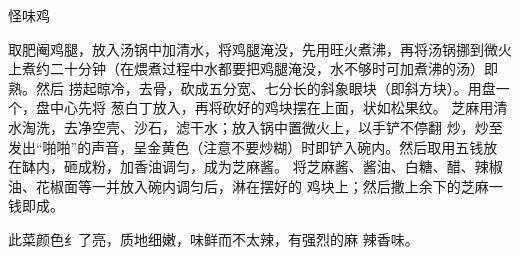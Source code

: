 \begin{recipe}{怪味鸡}

\ingredients


\cooking

\step 取肥阉鸡腿，放入汤锅中加清水，将鸡腿淹没，先用旺火煮沸，再将汤锅挪到微火
上煮约二十分钟（在煨煮过程中水都要把鸡腿淹没，水不够时可加煮沸的汤）即熟。然后
捞起晾冷，去骨，砍成五分宽、七分长的斜象眼块（即斜方块）。用盘一个，盘中心先将
葱白丁放入，再将砍好的鸡块摆在上面，状如松果纹。
\step 芝麻用清水淘洗，去净空壳、沙石，滤干水；放入锅中置微火上，以手铲不停翻
炒，炒至发出“啪啪”的声音，呈金黄色（注意不要炒糊）时即铲入碗内。然后取用五钱放
在缽内，砸成粉，加香油调匀，成为芝麻酱。
\step 将芝麻酱、酱油、白糖、醋、辣椒油、花椒面等一并放入碗内调匀后，淋在摆好的
鸡块上；然后撒上余下的芝麻一钱即成。

\notes

此菜颜色纟了亮，质地细嫩，味鲜而不太辣，有强烈的麻 辣香味。

\end{recipe}

